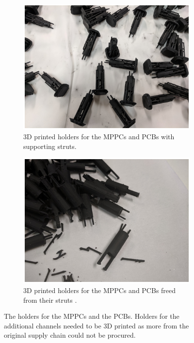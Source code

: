 \begin{figure}[htbp]
\centering
\begin{subfigure}{.5\textwidth}
  \centering
  \includegraphics[width=\linewidth]{Chapter3/Figs/Raster/detCon015b_3dPrintedHolders.png}
  \captionsetup{width=.9\linewidth}
  \caption{3D printed holders for the MPPCs and PCBs with supporting struts.}
  \label{subFig:detCon015b_3dPrintedHolders}
\end{subfigure}%
\begin{subfigure}{.5\textwidth}
  \centering
  \includegraphics[width=\linewidth]{Chapter3/Figs/Raster/detCon016b_3dPrintedFreed.png}
  \captionsetup{width=.9\linewidth}
  \caption{3D printed holders for the MPPCs and PCBs freed from their struts .}
  \label{subFig:detCon016b_3dPrintedFreed}
\end{subfigure}
\caption{The holders for the MPPCs and the PCBs. Holders for the additional channels needed to be 3D printed as more from the original supply chain could not be procured. }
\label{fig:detCon_3dPrintedHolders_3dPrintedFreed}
\end{figure}


